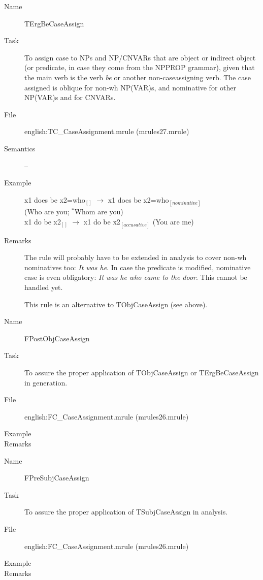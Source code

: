 \begin{description}
\vspace{1 cm}
\begin{description}
\item[Name] TErgBeCaseAssign
\item[Task] To assign case to NPs and NP/CNVARs that are object or 
indirect object (or predicate, in case they come from the NPPROP grammar), 
given that the main verb is the verb {\em be\/} or another non-caseassigning 
verb. The case assigned is oblique for non-wh NP(VAR)s, and 
nominative for other NP(VAR)s and for CNVARs.
\item[File] english:TC\_CaseAssignment.mrule (mrules27.mrule)
\item[Semantics] -- 
\item[Example] x1 does be x2=who$_{[]}$ $\rightarrow$ x1 does be 
x2=who$_{[nominative]}$ \\
(Who are you; $^{*}$Whom are you) \\
x1 do be x2$_{[]}$ $\rightarrow$ x1 do be x2$_{[accusative]}$ (You are me)
\item[Remarks] The rule will probably have to be  extended in analysis to cover 
non-wh nominatives too: {\em It was he\/}. In case the predicate is modified, 
nominative case is even obligatory: {\em It was he who came to the door\/}. 
This cannot be handled yet. 

This rule is an alternative to TObjCaseAssign (see above).
\end{description}

\vspace{1 cm}
\begin{description}
\item[Name] FPostObjCaseAssign
\item[Task] To assure the proper application of TObjCaseAssign or 
TErgBeCaseAssign in generation.
\item[File] english:FC\_CaseAssignment.mrule (mrules26.mrule)
\item[Example] 
\item[Remarks]
\end{description}

\vspace{1 cm}
\begin{description}
\item[Name] FPreSubjCaseAssign
\item[Task] To assure the proper application of TSubjCaseAssign in analysis.
\item[File] english:FC\_CaseAssignment.mrule (mrules26.mrule)
\item[Example] 
\item[Remarks]
\end{description}


\end{description}
